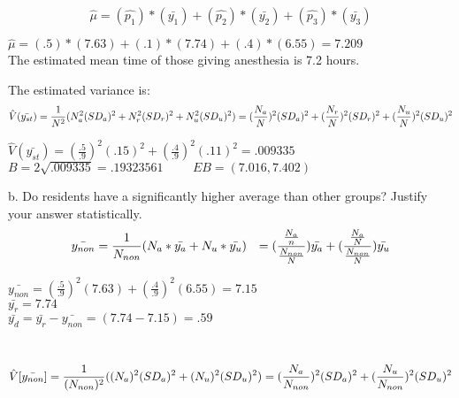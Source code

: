 \documentclass{article}
\begin{document}
\begin{equation}
    \hat{\mu} = (\hat{p_1})*(\bar{y_1}) + (\hat{p_2})*(\bar{y_2}) + (\hat{p_3})*(\bar{y_3})
\end{equation}
\begin{center}
   $\hat{\mu} = (.5)*(7.63) + (.1)*(7.74) + (.4)*(6.55) = 7.209$ \\
   The estimated mean time of those giving anesthesia is 7.2 hours. 
\end{center}
The estimated variance is: 
\begin{equation}
    \hat{V}(\bar{y_{st}}) = \frac{1}{N^2}(N_a^2 (SD_a)^2 + N_r^2 (SD_r)^2 + N_u^2 (SD_u)^2) \\
    = (\frac{N_a}{N})^2 (SD_a)^2 + (\frac{N_r}{N})^2 (SD_r)^2 + (\frac{N_u}{N})^2 (SD_u)^2 
\end{equation}
\begin{center}
   $\hat{V}(\bar{y_{st}}) = (\frac{.5}{.9})^2 (.15)^2 + (\frac{.4}{.9})^2 (.11)^2 = .009335 $\\
   \smallskip
   $B = 2\sqrt{.009335} = .19323561 \hspace{1cm} EB = (7.016, 7.402) $
\end{center}
b. Do residents have a significantly higher average than other groups? Justify your answer statistically.
\begin{equation}
    \bar{y_{non}} = \frac{1}{N_{non}}(N_a * \bar{y_a} + N_u * \bar{y_u}) \hspace{.25cm}
    = (\frac{\frac{N_a}{n}}{\frac{N_{non}}{N}})\bar{y_a} + (\frac{\frac{N_a}{N}}{\frac{N_{non}}{N}})\bar{y_u} \\
\end{equation}
\begin{center}
    $\bar{y_{non}} = (\frac{.5}{.9})^2 (7.63) + (\frac{.4}{.9})^2 (6.55) = 7.15 $ \\
    \smallskip
    $\bar{y_r} = 7.74 $\\
    \smallskip
    $\bar{y_d} = \bar{y_r} - \bar{y_{non}} = (7.74 - 7.15) = .59 $ 
\end{center}
 \\
\begin{equation}
    \hat{V}[\bar{y_{non}}] = \frac{1}{(N_{non})^2}((N_a)^2 (SD_a)^2 + (N_u)^2 (SD_u)^2) \\
    = (\frac{N_a}{N_{non}})^2 (SD_a)^2 + (\frac{N_u}{N_{non}})^2 (SD_u)^2 \\
\end{equation}
\end{document}

